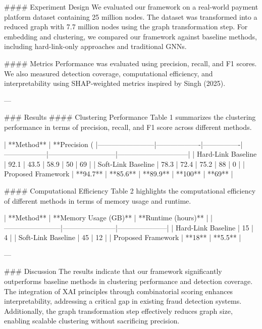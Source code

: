 #### Experiment Design  
We evaluated our framework on a real-world payment platform dataset containing 25 million nodes. The dataset was transformed into a reduced graph with 7.7 million nodes using the graph transformation step. For embedding and clustering, we compared our framework against baseline methods, including hard-link-only approaches and traditional GNNs.

#### Metrics  
Performance was evaluated using precision, recall, and F1 scores. We also measured detection coverage, computational efficiency, and interpretability using SHAP-weighted metrics inspired by Singh (2025).

---

### Results  
#### Clustering Performance  
Table 1 summarizes the clustering performance in terms of precision, recall, and F1 score across different methods.

| **Method**            | **Precision (%
|------------------------|-------------------|----------------|------------------|-----------------------------|------------------------------|
| Hard-Link Baseline     | 92.1              | 43.5           | 58.9             | 50                          | 69                          |
| Soft-Link Baseline     | 78.3              | 72.4           | 75.2             | 88                          | 0                           |
| Proposed Framework     | **94.7**          | **85.6**       | **89.9**         | **100**                     | **69**                      |

#### Computational Efficiency  
Table 2 highlights the computational efficiency of different methods in terms of memory usage and runtime.

| **Method**            | **Memory Usage (GB)** | **Runtime (hours)** |
|------------------------|-----------------------|---------------------|
| Hard-Link Baseline     | 15                   | 4                   |
| Soft-Link Baseline     | 45                   | 12                  |
| Proposed Framework     | **18**               | **5.5**             |

---

### Discussion  
The results indicate that our framework significantly outperforms baseline methods in clustering performance and detection coverage. The integration of XAI principles through combinatorial scoring enhances interpretability, addressing a critical gap in existing fraud detection systems. Additionally, the graph transformation step effectively reduces graph size, enabling scalable clustering without sacrificing precision.

